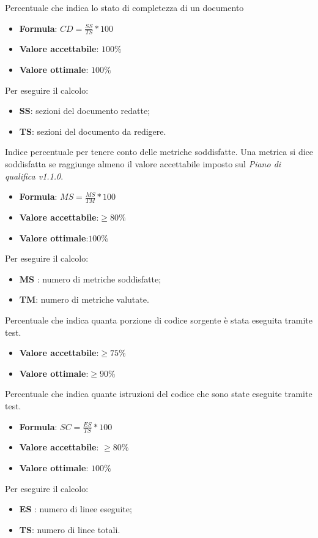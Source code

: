 Percentuale che indica lo stato di completezza di un documento
\begin{itemize}
    \item \textbf{Formula}: $CD=\frac{SS}{TS}*100$
    \item \textbf{Valore accettabile}: $100\%$
    \item \textbf{Valore ottimale}: $100\%$
\end{itemize} 
Per eseguire il calcolo:
\begin{itemize}
    \item \textbf{SS}: sezioni del documento redatte;
    \item \textbf{TS}: sezioni del documento da redigere.
\end{itemize} 


Indice percentuale per tenere conto delle metriche soddisfatte. Una
metrica si dice soddisfatta se raggiunge almeno il valore accettabile imposto sul \textit{Piano di qualifica v1.1.0}.
\begin{itemize}
    \item \textbf{Formula}: $MS = \frac{MS}{TM}*100$
    \item \textbf{Valore accettabile}:$\geq80\%$
    \item \textbf{Valore ottimale}:$100\%$
\end{itemize}  
Per eseguire il calcolo:
\begin{itemize}
    \item \textbf{MS} : numero di metriche soddisfatte;
    \item \textbf{TM}: numero di metriche valutate.
\end{itemize}

Percentuale che indica quanta porzione di codice sorgente è stata eseguita tramite test.
\begin{itemize}
    \item \textbf{Valore accettabile}:$\geq75\%$
    \item \textbf{Valore ottimale}:$\geq90\%$
\end{itemize} 

Percentuale che indica quante istruzioni del codice che sono state eseguite tramite test.
\begin{itemize}
    \item \textbf{Formula}: $SC = \frac{ES}{TS}*100$
    \item \textbf{Valore accettabile}: $\geq80\%$
    \item \textbf{Valore ottimale}: $100\%$
\end{itemize}  
Per eseguire il calcolo:
\begin{itemize}
    \item \textbf{ES} : numero di linee eseguite;
    \item \textbf{TS}: numero di linee totali.
\end{itemize}

